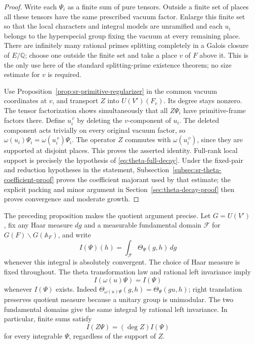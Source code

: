 \begin{proof}
Write each \(\Psi_i\) as a finite sum of pure tensors.  Outside a finite
set of places all these tensors have the same prescribed vacuum
factor.  Enlarge this finite set so that the local characters and
integral models are unramified and each \(u_i\) belongs to the
hyperspecial group fixing the vacuum at every remaining place.
There are infinitely many rational primes splitting completely in a
Galois closure of \(E/\mathbb Q\); choose one outside the finite set and
take a place \(v\) of \(F\) above it.  This is the only use here of the
standard splitting-prime existence theorem; no size estimate for \(v\)
is required.

Use Proposition~\ref{prop:sr-primitive-regularizer} in the common vacuum
coordinates at \(v\), and transport \(Z\) into \(U(V')(F_v)\).  Its
degree stays nonzero.  The tensor factorization shows simultaneously
that all \(Z\Psi_i\) have primitive-frame factors there.  Define
\(u_i^{\,v}\) by deleting the \(v\)-component of \(u_i\).
The deleted component acts trivially on every original vacuum factor,
so \(\omega(u_i)\Psi_i=\omega(u_i^{\,v})\Psi_i\).
The operator \(Z\) commutes with \(\omega(u_i^{\,v})\), since they are
supported at disjoint places.  This proves the asserted identity.
Full-rank local support is precisely the hypothesis of
\eqref{eq:theta-full-decay}.  Under the fixed-pair and reduction
hypotheses in the statement, Subsection~\ref{subsec:sr-theta-coefficient-proof}
proves the coefficient majorant used by that estimate; the explicit
packing and minor argument in Section~\ref{sec:theta-decay-proof}
then proves convergence and moderate growth.
\end{proof}

The preceding proposition makes the quotient argument precise.
Let \(G=U(V')\), fix any Haar measure \(dg\) and a measurable fundamental
domain \(\mathcal F\) for \(G(F)\backslash G(\mathbb A_F)\), and write
\[
 I(\Psi)(h)=\int_{\mathcal F}\Theta_\Psi(g,h)\,dg
\]
whenever this integral is absolutely convergent.  The choice of Haar
measure is fixed throughout.  The theta transformation law and
rational left invariance imply
\begin{equation}\label{eq:sr-ordinary-translate}
 I(\omega(u)\Psi)=I(\Psi)
\end{equation}
whenever \(I(\Psi)\) exists.  Indeed
\(\Theta_{\omega(u)\Psi}(g,h)=\Theta_\Psi(gu,h)\);
right translation preserves quotient measure because a unitary group
is unimodular.  The two fundamental domains give the same integral
by rational left invariance.  In particular, finite sums satisfy
\begin{equation}\label{eq:sr-ordinary-degree}
 I(Z\Psi)=(\deg Z)I(\Psi)
\end{equation}
for every integrable \(\Psi\), regardless of the support of \(Z\).

